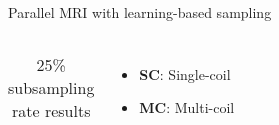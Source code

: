 \begin{frame}{Parallel MRI with learning-based sampling}
\begin{columns}[T]
\begin{table}
\begin{tabular}{lcccc}
\end{tabular}
\caption{\label{tab:cross_recon} 25\% subsampling rate results  }

\end{table}

\begin{itemize}
\item \textbf{SC}: Single-coil
\item \textbf{MC}: Multi-coil
\end{itemize}
\end{columns}
	
\vspace{3mm}

\begin{minipage}[t]{.45\linewidth}

\end{minipage}\hfill
\begin{minipage}[t]{.45\linewidth}

\end{minipage}

\end{frame}





